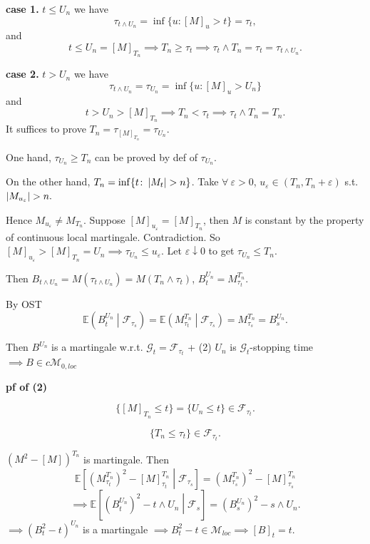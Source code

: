 {    \textbf{case 1.} $t \leq U_{n}$ we have
    $$
        \tau_{t \wedge U_{n}} = \inf \{u\colon [M]_{u}> t\} = \tau_{t},
    $$
    and
    $$
    t \leq U_{n} = [M]_{T_{n}} \implies T_{n} \geq \tau_{t} \implies \tau_{t} \wedge T_{n} = \tau_{t} = \tau_{t \wedge U_{n}}.
    $$

    \textbf{case 2.} $t > U_{n}$ we have
    $$
    \tau_{t \wedge U_{n}} = \tau_{U_{n}} = \inf \{u\colon [M]_{u} > U_{n}\}
    $$
    and
    $$
    t > U_{n} > [M]_{T_{n}} \implies T_{n} < \tau_{t} \implies \tau_{t} \wedge T_{n} = T_{n}.
    $$
    It suffices to prove $T_{n} = \tau_{[M]_{T_{n}}}= \tau_{U_{n}}$.

    One hand, $\tau_{U_{n}} \geq T_{n}$ can be proved by def of $\tau_{U_{n}}$.

    On the other hand, $T_{n} = \inf \{t \colon \left|  M_{t}  \right| > n\}$. Take $\forall~\varepsilon>0$, $u_{\varepsilon} \in (T_{n} , T_{n} + \varepsilon)$ s.t. $\abs{ M_{u_{\varepsilon}} }>n .$

    Hence $M_{u_{\varepsilon}} \neq M_{T_{n}}$. Suppose $[M]_{u_{\varepsilon}} = [M]_{T_{n}}$, then $M$ is constant by the property of continuous local martingale. Contradiction. So $[M]_{u_{\varepsilon}} > [M]_{T_{n}} = U_{n} \implies \tau_{U_{n}} \leq u_{\varepsilon}$. Let $\varepsilon \downarrow 0$ to get $\tau_{U_{n}} \leq T_{n}$.

    Then $B_{t \wedge U_n} = M(\tau_{t \wedge U_n}) = M(T_n \wedge \tau _t)$, $B_t^{U_n} = M_{\tau_t}^{T_n}.$

    By OST 
    $$
    \mathbb{E}\left( B_t^{U_n} \middle| \mathcal{F}_{\tau_s} \right) = \mathbb{E}\left( M_{\tau_t}^{T_n} \middle| \mathcal{F}_{\tau_s} \right) = M_{\tau_s}^{T_n} = B_s^{U_n}.
    $$

    Then $B^{U_n}$ is a martingale w.r.t. $\mathcal{G}_t = \mathcal{F}_{\tau_t}$ + (2) $U_n$ is $\mathcal{G}_t$-stopping time $\implies B \in c \mathcal{M}_{0,loc}$

    \textbf{pf of (2)}

    $$
    \{[M]_{T_n} \leq t\}=\{U_n \leq t\} \in \mathcal{F}_{\tau_t}.
    $$

    $$
    \{T_n \leq \tau_t\} \in \mathcal{F}_{\tau_t}.
    $$

    $\left( M^2 - [M] \right)^{T_n}$ is martingale. Then 
    $$
    \mathbb{E}\left[ (M_{\tau_t}^{T_n})^2 - [M]_{\tau_t}^{T_n} \middle|  \mathcal{F}_{\tau_s}\right]= \left( M_{\tau_s}^{T_n} \right)^2 - [M]_{\tau_s}^{T_n}
    $$  
    $$
    \implies \mathbb{E}\left[ 
        (B_t^{U_n})^2 - t \wedge U_n \middle| \mathcal{F}_s 
     \right] = (B_s^{U_n})^2 - s \wedge U_n.
    $$  
    $
    \implies (B_t^2 - t)^{U_n}
    $ is a martingale $\implies B_t^2 - t \in \mathcal{M}_{loc} \implies[B]_t = t.$
}   

